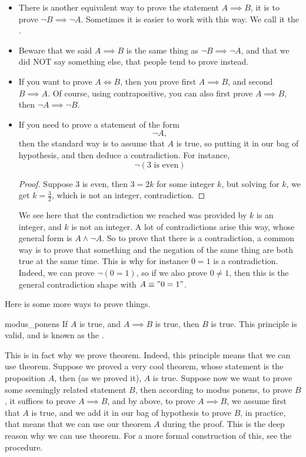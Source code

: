 \begin{itemize}
    \item There is another equivalent way to prove the statement \( A \implies B \), it is to prove \( \neg B \implies \neg A \). Sometimes it is easier to work with this way. We call it the .
    \item Beware that we said \( A \implies B \) is the same thing as \( \neg B \implies \neg A \), and that we did NOT say something else, that people tend to prove instead. 
    \item If you want to prove \( A \iff B \), then you prove first \( A \implies B \), and second \( B \implies A \). Of course, using contrapositive, you can also first prove \( A \implies B \), then \( \neg A \implies \neg B \).
    
    \item If you need to prove a statement of the form 
    \begin{equation*}
        \neg A,
    \end{equation*}
    then the standard way is to assume that \( A \) is true, so putting it in our bag of hypothesis, and then deduce a contradiction. For instance,
    \begin{equation*}
        \neg(3 \text{ is even})
    \end{equation*}
    \begin{proof}
        Suppose \( 3 \) is even, then \( 3 = 2k \) for some integer \( k \), but solving for \( k \), we get \( k = \frac 3 2 \), which is not an integer, contradiction. 
    \end{proof}
    We see here that the contradiction we reached was provided by \( k \) is an integer, and \( k \) is not an integer. A lot of contradictions arise this way, whose general form is \( A \land \neg A \). So to prove that there is a contradiction, a common way is to prove that something and the negation of the same thing are both true at the same time. This is why for instance \( 0 = 1 \) is a contradiction. Indeed, we can prove \( \neg (0 = 1) \), so if we also prove \( 0 \neq 1 \), then this is the general contradiction shape with \( A \equiv "0 = 1" \).
\end{itemize}

Here is some more ways to prove things. 
\begin{cdef}{}{modus_ponens}
    If \( A \) is true, and \( A \implies B \) is true, then \( B \) is true. This principle is valid, and is known as the .
\end{cdef} 
This is in fact why we prove theorem. Indeed, this principle means that we can use theorem. Suppose we proved a very cool theorem, whose statement is the proposition \( A \), then (as we proved it), \( A \) is true. Suppose now we want to prove some seemingly related statement \( B \), then according to modus ponens, to prove \( B \), it suffices to prove \( A \implies B \), and by above, to prove \( A \implies B \), we assume first that \( A \) is true, and we add it in our bag of hypothesis to prove \( B \), in practice, that means that we can use our theorem \( A \) during the proof. This is the deep reason why we can use theorem. For a more formal construction of this, see the  procedure.  

